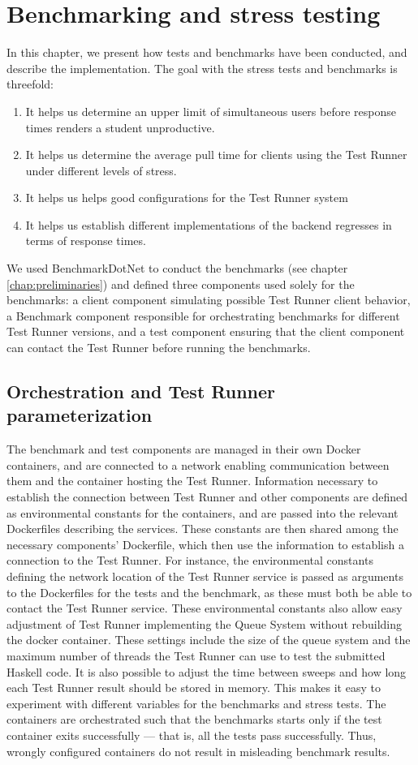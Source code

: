 \section{Benchmarking and stress testing} \label{chap:Benchmarking}
In this chapter, we present how tests and benchmarks have been conducted, and describe the implementation. 
The goal with the stress tests and benchmarks is threefold: 
\begin{enumerate}
\item It helps us determine an upper limit of simultaneous users before response times renders a student unproductive.
\item It helps us determine the average pull time for clients using the Test Runner under different levels of stress.
\item It helps us helps good configurations for the Test Runner system
\item It helps us establish different implementations of the backend regresses in terms of response times.
\end{enumerate}
We used BenchmarkDotNet to conduct the benchmarks (see chapter \ref{chap:preliminaries}) and defined three components used solely for the benchmarks:
a client component simulating possible Test Runner client behavior, a Benchmark component responsible for orchestrating benchmarks for different Test Runner versions, and a test component ensuring that the client component can contact the Test Runner before running the benchmarks.

\subsection{Orchestration and Test Runner parameterization}
The benchmark and test components are managed in their own Docker containers, and are connected to a network enabling communication between them and the container hosting the Test Runner. 
Information necessary to establish the connection between Test Runner and other components are defined as environmental constants for the containers, and are passed into the relevant Dockerfiles describing the services.
These constants are then shared among the necessary components' Dockerfile, which then use the information to establish a connection to the Test Runner.
For instance, the environmental constants defining the network location of the Test Runner service is passed as arguments to the Dockerfiles for the tests and the benchmark, as these must both be able to contact the Test Runner service.
These environmental constants also allow easy adjustment of Test Runner implementing the Queue System without rebuilding the docker container.
These settings include the size of the queue system and the maximum number of threads the Test Runner can use to test the submitted Haskell code. 
It is also possible to adjust the time between sweeps and how long each Test Runner result should be stored in memory.
This makes it easy to experiment with different variables for the benchmarks and stress tests.  
The containers are orchestrated such that the benchmarks starts only if the test container exits successfully --- that is, all the tests pass successfully. 
Thus, wrongly configured containers do not result in misleading benchmark results.

